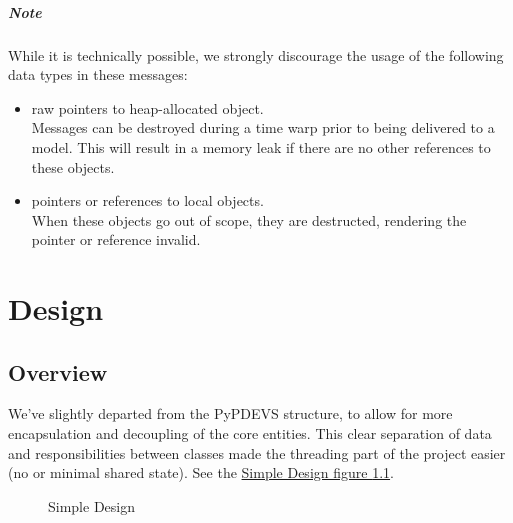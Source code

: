 \documentclass[8pt,a4paper]{report}
\begin{document}
\paragraph{Note} While it is technically possible, we strongly discourage the usage of the following data types in these messages:
\begin{itemize}
	\item raw pointers to heap-allocated object.\\
			Messages can be destroyed during a time warp prior to being delivered to a model. This will result in a memory leak if there are no other references to these objects.
	\item pointers or references to local objects.\\
		When these objects go out of scope, they are destructed, rendering the pointer or reference invalid.
\end{itemize}

\chapter{Design}
\section{Overview}
We've slightly departed from the PyPDEVS structure, to allow for more encapsulation and decoupling of the core entities. This clear separation of data and responsibilities between classes made the threading part of the project easier (no or minimal shared state). See the \hyperref[simpledesign]{Simple Design figure \ref*{simpledesign}}.\\

\begin{figure}[h!]
	\caption{Simple Design}
	\label{simpledesign}
\end{figure}
\end{document}
